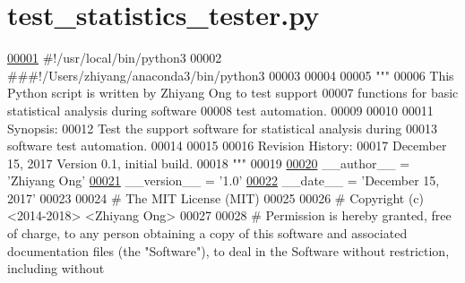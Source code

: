 \hypertarget{test__statistics__tester_8py_source}{}\section{test\+\_\+statistics\+\_\+tester.\+py}
\label{test__statistics__tester_8py_source}

\begin{DoxyCode}
\hypertarget{test__statistics__tester_8py_source_l00001}{}\hyperlink{namespacestatistics_1_1test__statistics__tester}{00001} \textcolor{comment}{#!/usr/local/bin/python3}
00002 \textcolor{comment}{###!/Users/zhiyang/anaconda3/bin/python3}
00003 
00004 
00005 \textcolor{stringliteral}{"""}
00006 \textcolor{stringliteral}{    This Python script is written by Zhiyang Ong to test support}
00007 \textcolor{stringliteral}{        functions for basic statistical analysis during software}
00008 \textcolor{stringliteral}{        test automation.}
00009 \textcolor{stringliteral}{}
00010 \textcolor{stringliteral}{}
00011 \textcolor{stringliteral}{    Synopsis:}
00012 \textcolor{stringliteral}{    Test the support software for statistical analysis during}
00013 \textcolor{stringliteral}{        software test automation.}
00014 \textcolor{stringliteral}{}
00015 \textcolor{stringliteral}{}
00016 \textcolor{stringliteral}{    Revision History:}
00017 \textcolor{stringliteral}{    December 15, 2017           Version 0.1, initial build.}
00018 \textcolor{stringliteral}{"""}
00019 
\hypertarget{test__statistics__tester_8py_source_l00020}{}\hyperlink{namespacestatistics_1_1test__statistics__tester_ab9ecb1d5ecfb751c8b2a27ac138a0eed}{00020} \_\_author\_\_ = \textcolor{stringliteral}{'Zhiyang Ong'}
\hypertarget{test__statistics__tester_8py_source_l00021}{}\hyperlink{namespacestatistics_1_1test__statistics__tester_a29677162e8392e196da563156d924f5d}{00021} \_\_version\_\_ = \textcolor{stringliteral}{'1.0'}
\hypertarget{test__statistics__tester_8py_source_l00022}{}\hyperlink{namespacestatistics_1_1test__statistics__tester_a0d2103581aebe4f7dfb05775432fa386}{00022} \_\_date\_\_ = \textcolor{stringliteral}{'December 15, 2017'}
00023 
00024 \textcolor{comment}{#   The MIT License (MIT)}
00025 
00026 \textcolor{comment}{#   Copyright (c) <2014-2018> <Zhiyang Ong>}
00027 
00028 \textcolor{comment}{#   Permission is hereby granted, free of charge, to any person obtaining a copy of this software and
       associated documentation files (the "Software"), to deal in the Software without restriction, including without
}
\end{DoxyCode}
